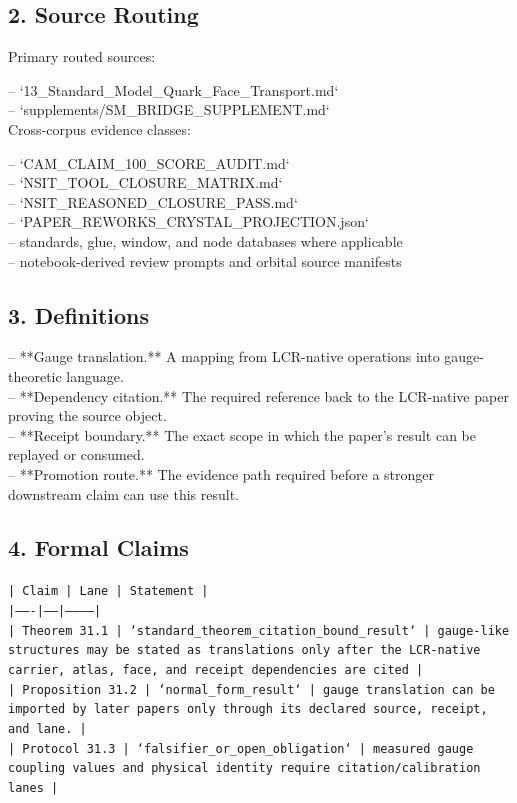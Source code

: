 \documentclass[11pt]{article}
\begin{document}
\subsection*{2. Source Routing}

Primary routed sources:

\noindent{}-- `13\_Standard\_Model\_Quark\_Face\_Transport.md`\\
\noindent{}-- `supplements/SM\_BRIDGE\_SUPPLEMENT.md`\\

Cross-corpus evidence classes:

\noindent{}-- `CAM\_CLAIM\_100\_SCORE\_AUDIT.md`\\
\noindent{}-- `NSIT\_TOOL\_CLOSURE\_MATRIX.md`\\
\noindent{}-- `NSIT\_REASONED\_CLOSURE\_PASS.md`\\
\noindent{}-- `PAPER\_REWORKS\_CRYSTAL\_PROJECTION.json`\\
\noindent{}-- standards, glue, window, and node databases where applicable\\
\noindent{}-- notebook-derived review prompts and orbital source manifests\\

\subsection*{3. Definitions}

\noindent{}-- **Gauge translation.** A mapping from LCR-native operations into gauge-theoretic language.\\
\noindent{}-- **Dependency citation.** The required reference back to the LCR-native paper proving the source object.\\
\noindent{}-- **Receipt boundary.** The exact scope in which the paper's result can be replayed or consumed.\\
\noindent{}-- **Promotion route.** The evidence path required before a stronger downstream claim can use this result.\\

\subsection*{4. Formal Claims}

\noindent\texttt{| Claim | Lane | Statement |}\\
\noindent\texttt{|-------|------|-----------|}\\
\noindent\texttt{| Theorem 31.1 | `standard\_theorem\_citation\_bound\_result` | gauge-like structures may be stated as translations only after the LCR-native carrier, atlas, face, and receipt dependencies are cited |}\\
\noindent\texttt{| Proposition 31.2 | `normal\_form\_result` | gauge translation can be imported by later papers only through its declared source, receipt, and lane. |}\\
\noindent\texttt{| Protocol 31.3 | `falsifier\_or\_open\_obligation` | measured gauge coupling values and physical identity require citation/calibration lanes |}\\
\end{document}
